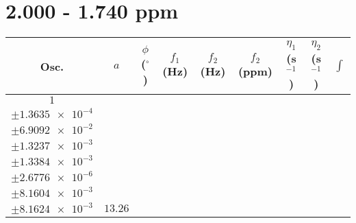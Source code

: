 \documentclass[8pt]{article}
\begin{document}
\section*{2.000 - 1.740 ppm}
\begin{longtable}[l]{c c c c c c c c c}
\toprule
Osc. & $a$ & $\phi$ ($^{\circ}$) & $f_1$ (Hz) & $f_2$ (Hz) & $f_2$ (ppm) & $\eta_1$ (s$^{-1}$) & $\eta_2$ (s$^{-1}$) & $\int$\\
\midrule
$\num{1}$ & \begin{tabular}[c]{@{}c@{}}$\num{0.11496}$ \\ $\pm\num{1.3635e-4}$\end{tabular} & \begin{tabular}[c]{@{}c@{}}$\num{1.2616}$ \\ $\pm\num{6.9092e-2}$\end{tabular} & \begin{tabular}[c]{@{}c@{}}$\num{-6.6249}$ \\ $\pm\num{1.3237e-3}$\end{tabular} & \begin{tabular}[c]{@{}c@{}}$\num{937.96}$ \\ $\pm\num{1.3384e-3}$\end{tabular} & \begin{tabular}[c]{@{}c@{}}$\num{1.8764}$ \\ $\pm\num{2.6776e-6}$\end{tabular} & \begin{tabular}[c]{@{}c@{}}$\num{6.1409}$ \\ $\pm\num{8.1604e-3}$\end{tabular} & \begin{tabular}[c]{@{}c@{}}$\num{6.1826}$ \\ $\pm\num{8.1624e-3}$\end{tabular} & $\num{13.26}$\\

\end{longtable}
\end{document}
